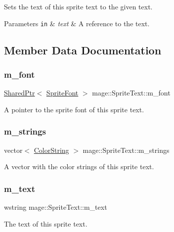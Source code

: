 Sets the text of this sprite text to the given text.


\begin{DoxyParams}[1]{Parameters}
\mbox{\tt in}  & {\em text} & A reference to the text. \\
\hline
\end{DoxyParams}


\subsection{Member Data Documentation}
\hypertarget{classmage_1_1_sprite_text_a922e37fbcbc431e815ebabe82e4528b0}{}\label{classmage_1_1_sprite_text_a922e37fbcbc431e815ebabe82e4528b0} 
\subsubsection{\texorpdfstring{m\+\_\+font}{m\_font}}
{\footnotesize\ttfamily \hyperlink{namespacemage_a1e01ae66713838a7a67d30e44c67703e}{Shared\+Ptr}$<$ \hyperlink{classmage_1_1_sprite_font}{Sprite\+Font} $>$ mage\+::\+Sprite\+Text\+::m\+\_\+font\hspace{0.3cm}{\ttfamily [private]}}

A pointer to the sprite font of this sprite text. \hypertarget{classmage_1_1_sprite_text_ab528f96257fd7e690be765241b2d76f7}{}\label{classmage_1_1_sprite_text_ab528f96257fd7e690be765241b2d76f7} 
\subsubsection{\texorpdfstring{m\+\_\+strings}{m\_strings}}
{\footnotesize\ttfamily vector$<$ \hyperlink{structmage_1_1_color_string}{Color\+String} $>$ mage\+::\+Sprite\+Text\+::m\+\_\+strings\hspace{0.3cm}{\ttfamily [private]}}

A vector with the color strings of this sprite text. \hypertarget{classmage_1_1_sprite_text_a807d5dc467ef16f6c83762dfe6ad3391}{}\label{classmage_1_1_sprite_text_a807d5dc467ef16f6c83762dfe6ad3391} 
\subsubsection{\texorpdfstring{m\+\_\+text}{m\_text}}
{\footnotesize\ttfamily wstring mage\+::\+Sprite\+Text\+::m\+\_\+text\hspace{0.3cm}{\ttfamily [private]}}

The text of this sprite text. 